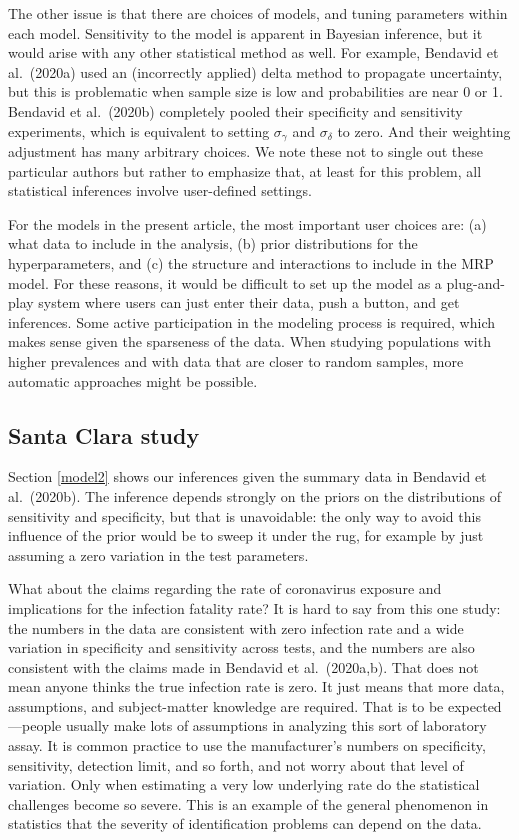 \documentclass[11pt]{article}
\begin{document}
The other issue is that there are choices of models, and tuning
parameters within each model.  Sensitivity to the model is apparent in
Bayesian inference, but it would arise with any other statistical
method as well.  For example, Bendavid et al.\ (2020a) used an
(incorrectly applied) delta method to propagate uncertainty, but this
is problematic when sample size is low and probabilities are near 0 or
1.  Bendavid et al.\ (2020b) completely pooled their specificity and
sensitivity experiments, which is equivalent to setting
$\sigma_{\gamma}$ and $\sigma_{\delta}$ to zero.  And their weighting
adjustment has many arbitrary choices.  We note these not to single
out these particular authors but rather to emphasize that, at least
for this problem, all statistical inferences involve user-defined
settings.

For the models in the present article, the most important user choices
are: (a) what data to include in the analysis, (b) prior distributions
for the hyperparameters, and (c) the structure and interactions to
include in the MRP model.  For these reasons, it would be difficult to
set up the model as a plug-and-play system where users can just enter
their data, push a button, and get inferences.  Some active
participation in the modeling process is required, which makes sense
given the sparseness of the data.  When studying populations with
higher prevalences and with data that are closer to random samples,
more automatic approaches might be possible.

\subsection{Santa Clara study}

Section \ref{model2} shows our inferences given the summary data in
Bendavid et al.\ (2020b).  The inference depends strongly on the
priors on the distributions of sensitivity and specificity, but that
is unavoidable: the only way to avoid this influence of the prior
would be to sweep it under the rug, for example by just assuming a
zero variation in the test parameters.

What about the claims regarding the rate of coronavirus exposure and
implications for the infection fatality rate?  It is hard to say from
this one study: the numbers in the data are consistent with zero
infection rate and a wide variation in specificity and sensitivity
across tests, and the numbers are also consistent with the claims made
in Bendavid et al.\ (2020a,b). That does not mean anyone thinks the
true infection rate is zero.  It just means that more data,
assumptions, and subject-matter knowledge are required. That is to be
expected---people usually make lots of assumptions in analyzing this
sort of laboratory assay. It is common practice to use the
manufacturer's numbers on specificity, sensitivity, detection limit,
and so forth, and not worry about that level of variation. Only when
estimating a very low underlying rate do the statistical challenges
become so severe. This is an example of the general phenomenon in
statistics that the severity of identification problems can depend on
the data.
\end{document}

